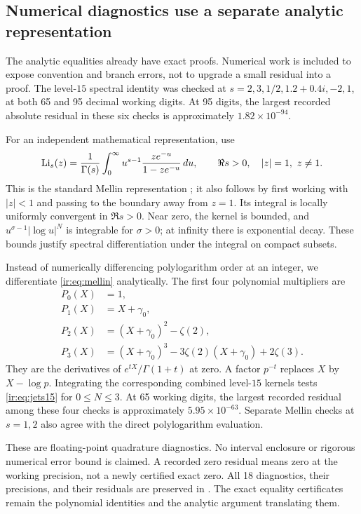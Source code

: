 \subsection{Numerical diagnostics use a separate analytic representation}
The analytic equalities already have exact proofs. Numerical work is
included to expose convention and branch errors, not to upgrade a
small residual into a proof. The level-$15$ spectral identity was
checked at $s=2,3,1/2,1.2+0.4i,-2,1$, at both 65 and 95 decimal
working digits. At 95 digits, the largest recorded absolute residual
in these six checks is approximately $1.82\times10^{-94}$.

For an independent mathematical representation, use
\begin{equation}\label{ir:eq:mellin}
 \operatorname{Li}_s(z)=\frac1{\Gamma(s)}\int_0^\infty
 u^{s-1}\frac{ze^{-u}}{1-ze^{-u}}\,du,
 \qquad\Re s>0,\quad |z|=1,\ z\ne1.
\end{equation}
This is the standard Mellin representation \cite{dlmf-polylog}; it
also follows by first working with $|z|<1$ and passing to the boundary
away from $z=1$. Its integral is locally uniformly convergent in
$\Re s>0$. Near zero, the kernel is bounded, and
$u^{\sigma-1}|\log u|^N$ is integrable for $\sigma>0$;
at infinity there is exponential decay. These bounds justify spectral
differentiation under the integral on compact subsets.

Instead of numerically differencing polylogarithm order at an integer,
we differentiate \eqref{ir:eq:mellin} analytically. The first four
polynomial multipliers are
\begin{align*}
 P_0(X)&=1,\\
 P_1(X)&=X+\gamma_0,\\
 P_2(X)&=(X+\gamma_0)^2-\zeta(2),\\
 P_3(X)&=(X+\gamma_0)^3-3\zeta(2)(X+\gamma_0)+2\zeta(3).
\end{align*}
They are the derivatives of $e^{tX}/\Gamma(1+t)$ at zero.
A factor $p^{-t}$ replaces $X$ by $X-\log p$. Integrating the
corresponding combined level-$15$ kernels tests
\eqref{ir:eq:jets15} for $0\le N\le3$. At 65 working digits, the
largest recorded residual among these four checks is approximately
$5.95\times10^{-63}$. Separate Mellin checks at $s=1,2$ also agree
with the direct polylogarithm evaluation.

These are floating-point quadrature diagnostics. No interval enclosure
or rigorous numerical error bound is claimed. A recorded zero residual
means zero at the working precision, not a newly certified exact zero.
All 18 diagnostics, their precisions, and their residuals are preserved
in . The exact equality certificates
remain the polynomial identities and the analytic argument translating
them.

